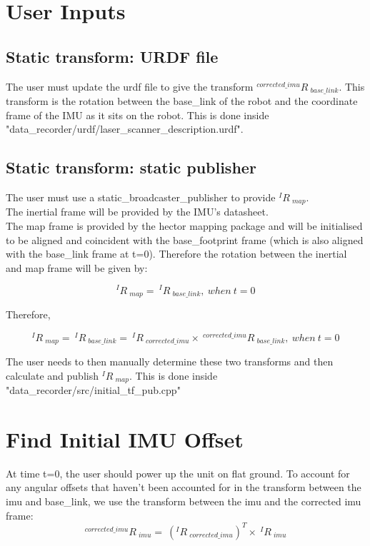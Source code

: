 \documentclass{article}
\begin{document}
\section{User Inputs}

\subsection{Static transform: URDF file}
The user must update the urdf file to give the transform $ {^{corrected\_imu}R\ _{base\_link}} $. This transform is the rotation between the base\_link of the robot and the coordinate frame of the IMU as it sits on the robot. This is done inside "data\_recorder/urdf/laser\_scanner\_description.urdf".

\subsection{Static transform: static publisher}
The user must use a static\_broadcaster\_publisher to provide $ {^{I}R\ _{map}}$.\\

The inertial frame will be provided by the IMU's datasheet.\\

The map frame is provided by the hector mapping package and will be initialised to be aligned and coincident with the base\_footprint frame (which is also aligned with the base\_link frame at t=0). Therefore the rotation between the inertial and map frame will be given by:

\begin{equation}
^{I}R\ _{map}=\ ^{I}R\ _{base\_link},\ when\ t=0
\end{equation}

Therefore,

\begin{equation}
^{I}R\ _{map}=\ ^{I}R\ _{base\_link}=\ ^{I}R\ _{corrected\_imu} \times\ ^{corrected\_imu}R\ _{base\_link},\ when\ t=0
\end{equation}

The user needs to then manually determine these two transforms and then calculate and publish $^{I}R\ _{map}$. This is done inside "data\_recorder/src/initial\_tf\_pub.cpp"

\section{Find Initial IMU Offset}
At time t=0, the user should power up the unit on flat ground. To account for any angular offsets that haven't been accounted for in the transform between the imu and base\_link, we use the transform between the imu and the corrected imu frame:
\begin{equation}
^{corrected\_imu}R\ _{imu} =\ (^{I}R\ _{corrected\_imu})^T \times\  ^{I}R\ _{imu}
\end{equation}
\end{document}
